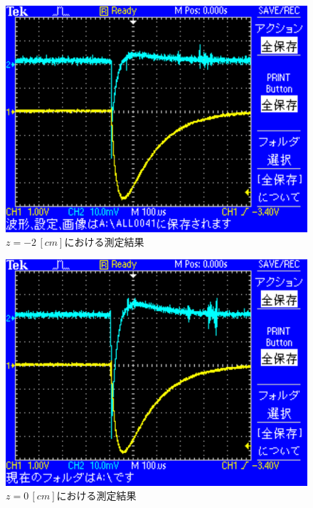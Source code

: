 \begin{figure}[H]
    \centering
    \includegraphics[scale=0.5]{images-19.pdf}
    \caption{$z=-2\,[cm]$における測定結果}
\end{figure}

\begin{figure}[H]
    \centering
    \includegraphics[scale=0.5]{images-1.pdf}
    \caption{$z=0\,[cm]$における測定結果}
\end{figure}

